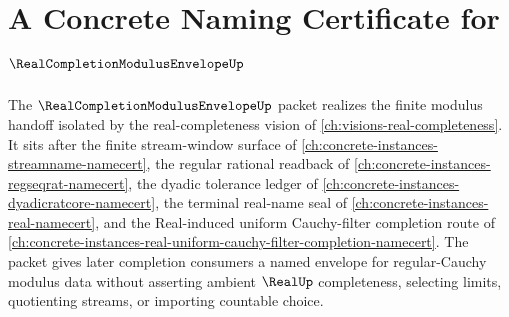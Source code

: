 \chapter{A Concrete Naming Certificate for $\RealCompletionModulusEnvelopeUp$}
\label{ch:concrete-instances-real-completion-modulus-envelope-namecert}

The $\RealCompletionModulusEnvelopeUp$ packet realizes the finite modulus handoff isolated by the real-completeness vision of \autoref{ch:visions-real-completeness}. It sits after the finite stream-window surface of \autoref{ch:concrete-instances-streamname-namecert}, the regular rational readback of \autoref{ch:concrete-instances-regseqrat-namecert}, the dyadic tolerance ledger of \autoref{ch:concrete-instances-dyadicratcore-namecert}, the terminal real-name seal of \autoref{ch:concrete-instances-real-namecert}, and the Real-induced uniform Cauchy-filter completion route of \autoref{ch:concrete-instances-real-uniform-cauchy-filter-completion-namecert}. The packet gives later completion consumers a named envelope for regular-Cauchy modulus data without asserting ambient $\RealUp$ completeness, selecting limits, quotienting streams, or importing countable choice.

